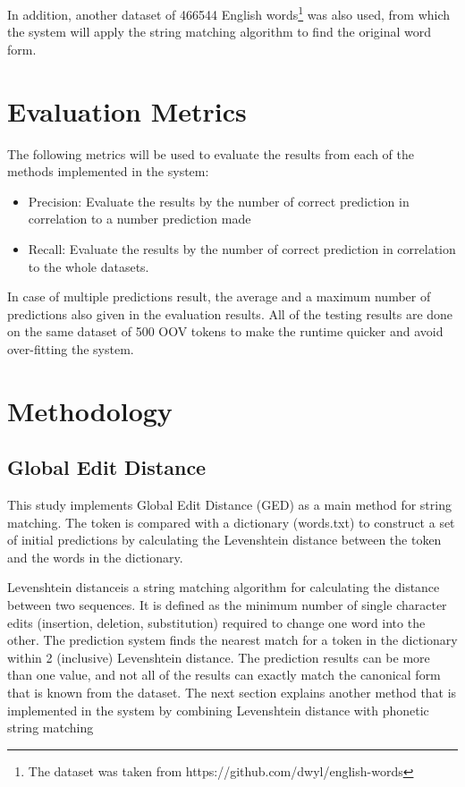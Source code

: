 \documentclass[11pt]{article}
\begin{document}
In addition, another dataset of 466544 English words\footnote{The dataset was taken from https://github.com/dwyl/english-words} was also used, from which the system will apply the string matching algorithm to find the original word form.

\section{Evaluation Metrics}
The following metrics will be used to evaluate the results from each of the methods implemented in the system:
\begin{itemize}
    \item Precision: Evaluate the results by the number of correct prediction in correlation to a number prediction made
    \item Recall: Evaluate the results by the number of correct prediction in correlation to the whole datasets.
\end{itemize}
In case of multiple predictions result, the average and a maximum number of predictions also given in the evaluation results. All of the testing results are done on the same dataset of 500 OOV tokens to make the runtime quicker and avoid over-fitting the system.

\section{Methodology}
\subsection{Global Edit Distance}
This study implements Global Edit Distance (GED) as a main method for string matching. The token is compared with a dictionary (words.txt) to construct a set of initial predictions by calculating the Levenshtein distance between the token and the words in the dictionary.

Levenshtein distance\footnotemark is a string matching algorithm for calculating the distance between two sequences. It is defined as the minimum number of single character edits (insertion, deletion, substitution) required to change one word into the other. The prediction system finds the nearest match for a token in the dictionary within 2 (inclusive) Levenshtein distance. The prediction results can be more than one value, and not all of the results can exactly match the canonical form that is known from the dataset. The next section explains another method that is implemented in the system by combining Levenshtein distance with phonetic string matching
\end{document}
